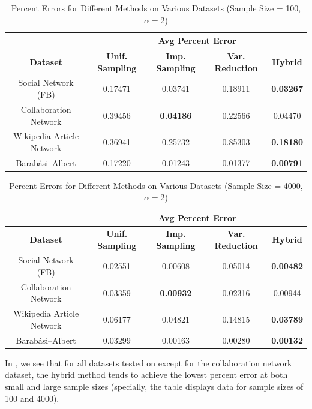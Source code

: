\documentclass[11pt, margin=1in]{article}
\begin{document}
\begin{table}[ht]
\centering
\caption{Percent Errors for Different Methods on Various Datasets (Sample Size = 100, $\alpha = 2$)}
\label{tab:percent_error_100}
\begin{tabular}{|c|c|c|c|c|}
\hline
& \multicolumn{4}{c|}{\textbf{Avg Percent Error}} \\
\hline
\textbf{Dataset} & \textbf{Unif. Sampling} & \textbf{Imp. Sampling} & \textbf{Var. Reduction} & \textbf{Hybrid} \\
\hline
Social Network (FB) & 0.17471 & 0.03741 & 0.18911 & \textbf{0.03267} \\
Collaboration Network & 0.39456 & \textbf{0.04186} & 0.22566 & 0.04470 \\
Wikipedia Article Network & 0.36941 & 0.25732 & 0.85303 & \textbf{0.18180} \\
Barab\'asi--Albert & 0.17220 & 0.01243 & 0.01377 & \textbf{0.00791} \\
\hline
\end{tabular}
\end{table}

\begin{table}[ht]
\centering
\caption{Percent Errors for Different Methods on Various Datasets (Sample Size = 4000, $\alpha = 2$)}
\label{tab:percent_error_4000}
\begin{tabular}{|c|c|c|c|c|}
\hline
& \multicolumn{4}{c|}{\textbf{Avg Percent Error}} \\
\hline
\textbf{Dataset} & \textbf{Unif. Sampling} & \textbf{Imp. Sampling} & \textbf{Var. Reduction} & \textbf{Hybrid} \\
\hline
Social Network (FB) & 0.02551 & 0.00608 & 0.05014 & \textbf{0.00482} \\
Collaboration Network & 0.03359 & \textbf{0.00932} & 0.02316 & 0.00944 \\
Wikipedia Article Network & 0.06177 & 0.04821 & 0.14815 & \textbf{0.03789} \\
Barab\'asi--Albert & 0.03299 & 0.00163 & 0.00280 & \textbf{0.00132} \\
\hline
\end{tabular}
\end{table}

In , we see that for all datasets tested on except for the collaboration network dataset, the hybrid method tends to achieve the lowest percent error at both small and large sample sizes (specially, the table displays data for sample sizes of 100 and 4000).
\end{document}

